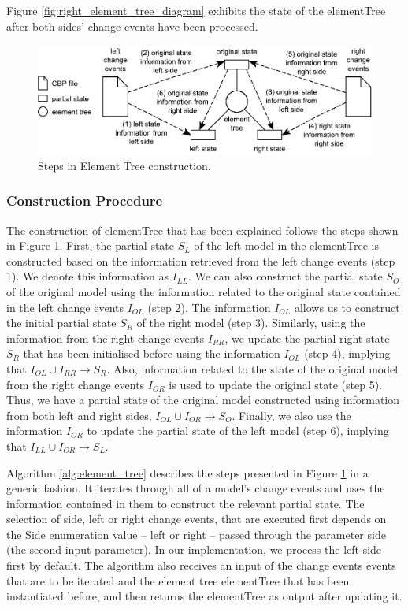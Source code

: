 Figure \ref{fig:right_element_tree_diagram} exhibits the state of the \textsf{elementTree} after both sides' change events have been processed.

\begin{figure}[]
  \centering
  \includegraphics[width=0.8\linewidth]{TreeConstruction}
  \caption{Steps in Element Tree construction.}
  \label{fig:tree_construction}
\end{figure} 

\subsubsection{Construction Procedure}\label{sec:construction_procedure}
The construction of \textsf{elementTree} that has been explained follows the steps shown in Figure \ref{fig:tree_construction}. First, the partial
state $S_{L}$ of the left model in the \textsf{elementTree} is constructed based on the information retrieved from the left change events (step 1). We denote this information as $I_{LL}$. We can also construct the partial 
state $S_{O}$ of the original model using the information related to the original state contained in the left change events $I_{OL}$ (step 2). The information $I_{OL}$ allows us to construct the initial partial 
state $S_{R}$ of the right model 
(step 3). Similarly, using the information from the right change events $I_{RR}$, we update the partial right state $S_{R}$ that has been initialised before using the information $I_{OL}$ (step 4), implying that $I_{OL} \cup I_{RR} \rightarrow S_{R}$. Also, information related to the state of the original model from the right change events $I_{OR}$ is used to update the original state  (step 5). Thus, we have a partial state of the original model constructed using information from both left and right sides, $I_{OL} \cup I_{OR} \rightarrow S_{O}$. Finally, we also use the information $I_{OR}$ to update the partial state of the left model (step 6), implying that $I_{LL} \cup I_{OR} \rightarrow S_{L}$.  

Algorithm \ref{alg:element_tree} describes the steps presented in Figure \ref{fig:tree_construction} in a generic fashion. It iterates through all of a model's change events and uses the information contained in them to construct the relevant partial state. The selection of side, left or right change events, that are executed first depends on the \textsf{Side} enumeration value -- \textsf{left} or \textsf{right} -- passed through the parameter \textsf{side} (the second input parameter). In our implementation, we process the left side first by default. The algorithm also receives an input of the change events \textsf{events} that are to be iterated and the element tree \textsf{elementTree} that has been instantiated before, and then returns the \textsf{elementTree} as output after updating it.

